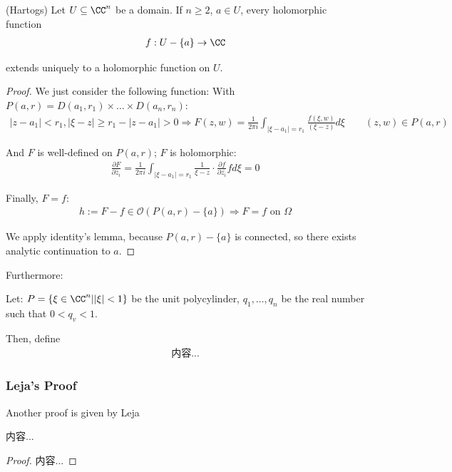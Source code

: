 \documentclass[Total.tex]{subfiles}
\begin{document}
		\begin{theorem}
			(Hartogs) Let $U\subseteq \CC^n$ be a domain. If $n\geq 2$, $a\in U$, every holomorphic function
			\begin{gather*}
				f:U-\{a\}\rightarrow \CC
			\end{gather*}
			
			extends uniquely to a holomorphic function on $U$.
		\end{theorem}
		\begin{proof}
			We just consider the following function: With $P(a,r)=D(a_1,r_1)\times\dots\times D(a_n,r_n)$:\
			\begin{gather*}
				|z-a_1|<r_1,|\xi-z|\geq r_1-|z-a_1|>0\Rightarrow F(z,w)=\frac{1}{2\pi i} \int_{|\xi-a_1|=r_1} \frac{f(\xi,w)}{(\xi-z)}d\xi\qquad (z,w)\in P(a,r)
			\end{gather*}
			
			And $F$ is well-defined on $P(a,r)$; $F$ is holomorphic:
			\begin{gather*}
				\frac{\partial F}{\partial \bar{z}_i}=\frac{1}{2\pi i} \int_{|\xi-a_1|=r_1} \frac{1}{\xi-z}\cdot \frac{\partial f}{\partial \bar{z_i}}fd\xi=0
			\end{gather*}
			
			Finally, $F=f$:
			\begin{gather*}
				h:=F-f\in \mathcal{O}(P(a,r)-\{a\})\Rightarrow F=f\mbox{ on }\Omega
			\end{gather*}
			
			We apply identity's lemma, because $P(a,r)-\{a\}$ is connected, so there exists analytic continuation to $a$. 
		\end{proof}
		
		Furthermore:
		
		\begin{Def}
			Let: $
			P=\{\xi\in \CC^n||\xi|<1\}$ be the unit polycylinder, $q_1,\dots,q_n$ be the real number such that $0<q_v<1$.
			
			Then, define
			\begin{gather*}
				内容...
			\end{gather*}
		\end{Def}
		
		
		\subsubsection{Leja's Proof}
		
		Another proof is given by Leja
		\begin{lemma}
			内容...
		\end{lemma}
		\begin{proof}
			内容...
		\end{proof}
\end{document}
